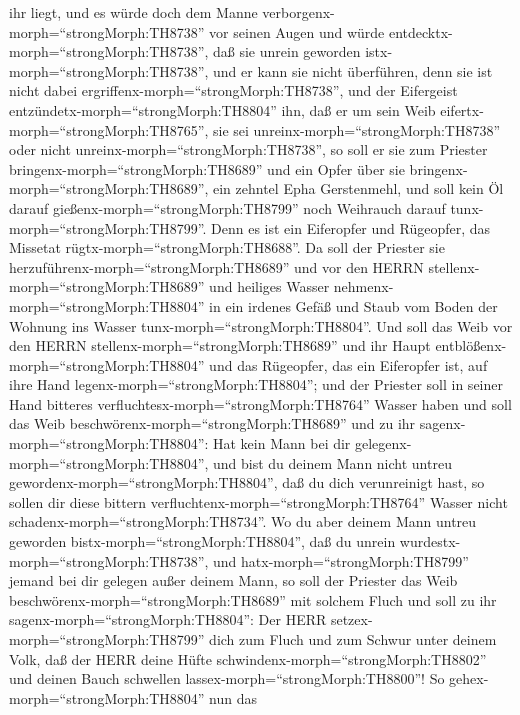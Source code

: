 ihr liegt, und es würde doch dem Manne
verborgenx-morph=``strongMorph:TH8738'' vor seinen Augen und würde
entdecktx-morph=``strongMorph:TH8738'', daß sie unrein geworden
istx-morph=``strongMorph:TH8738'', und er kann sie nicht überführen,
denn sie ist nicht dabei ergriffenx-morph=``strongMorph:TH8738'',
 und der Eifergeist entzündetx-morph=``strongMorph:TH8804''
ihn, daß er um sein Weib eifertx-morph=``strongMorph:TH8765'', sie sei
unreinx-morph=``strongMorph:TH8738'' oder nicht
unreinx-morph=``strongMorph:TH8738'',  so soll er sie zum
Priester bringenx-morph=``strongMorph:TH8689'' und ein Opfer über sie
bringenx-morph=``strongMorph:TH8689'', ein zehntel Epha Gerstenmehl, und
soll kein Öl darauf gießenx-morph=``strongMorph:TH8799'' noch Weihrauch
darauf tunx-morph=``strongMorph:TH8799''. Denn es ist ein Eiferopfer und
Rügeopfer, das Missetat rügtx-morph=``strongMorph:TH8688''.
 Da soll der Priester sie
herzuführenx-morph=``strongMorph:TH8689'' und vor den HERRN
stellenx-morph=``strongMorph:TH8689''  und heiliges Wasser
nehmenx-morph=``strongMorph:TH8804'' in ein irdenes Gefäß und Staub vom
Boden der Wohnung ins Wasser tunx-morph=``strongMorph:TH8804''.
 Und soll das Weib vor den HERRN
stellenx-morph=``strongMorph:TH8689'' und ihr Haupt
entblößenx-morph=``strongMorph:TH8804'' und das Rügeopfer, das ein
Eiferopfer ist, auf ihre Hand legenx-morph=``strongMorph:TH8804''; und
der Priester soll in seiner Hand bitteres
verfluchtesx-morph=``strongMorph:TH8764'' Wasser haben  und
soll das Weib beschwörenx-morph=``strongMorph:TH8689'' und zu ihr
sagenx-morph=``strongMorph:TH8804'': Hat kein Mann bei dir
gelegenx-morph=``strongMorph:TH8804'', und bist du deinem Mann nicht
untreu gewordenx-morph=``strongMorph:TH8804'', daß du dich verunreinigt
hast, so sollen dir diese bittern
verfluchtenx-morph=``strongMorph:TH8764'' Wasser nicht
schadenx-morph=``strongMorph:TH8734''.  Wo du aber deinem
Mann untreu geworden bistx-morph=``strongMorph:TH8804'', daß du unrein
wurdestx-morph=``strongMorph:TH8738'', und
hatx-morph=``strongMorph:TH8799'' jemand bei dir gelegen außer deinem
Mann,  so soll der Priester das Weib
beschwörenx-morph=``strongMorph:TH8689'' mit solchem Fluch und soll zu
ihr sagenx-morph=``strongMorph:TH8804'': Der HERR
setzex-morph=``strongMorph:TH8799'' dich zum Fluch und zum Schwur unter
deinem Volk, daß der HERR deine Hüfte
schwindenx-morph=``strongMorph:TH8802'' und deinen Bauch schwellen
lassex-morph=``strongMorph:TH8800''!  So
gehex-morph=``strongMorph:TH8804'' nun das
